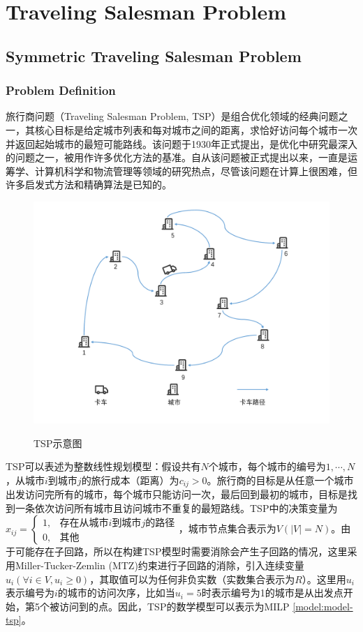 \part{Traveling Salesman Problem}
\chapter{Symmetric Traveling Salesman Problem}

\section{Problem Definition}
旅行商问题（Traveling Salesman Problem, TSP）是组合优化领域的经典问题之一，其核心目标是给定城市列表和每对城市之间的距离，求恰好访问每个城市一次并返回起始城市的最短可能路线。该问题于1930年正式提出，是优化中研究最深入的问题之一，被用作许多优化方法的基准。自从该问题被正式提出以来，一直是运筹学、计算机科学和物流管理等领域的研究热点，尽管该问题在计算上很困难，但许多启发式方法和精确算法是已知的\cite{2009A, 2012Models}。

\begin{figure}[!htb]
    \centering
    \includegraphics[width=\linewidth]{images/TSP.pdf}\\
    \caption{TSP示意图}
\end{figure}

TSP可以表述为整数线性规划模型\cite{papadimitriou1998combinatorial}：假设共有$N$个城市，每个城市的编号为$1,\cdots,N$，从城市$i$到城市$j$的旅行成本（距离）为$c_{ij}>0$。旅行商的目标是从任意一个城市出发访问完所有的城市，每个城市只能访问一次，最后回到最初的城市，目标是找到一条依次访问所有城市且访问城市不重复的最短路线。TSP中的决策变量为$x_{ij}=\begin{cases}1, & \text{存在从城市$i$到城市$j$的路径}\\0, & \text{其他} \end{cases}$，城市节点集合表示为$V(|V| = N)$。由于可能存在子回路，所以在构建TSP模型时需要消除会产生子回路的情况，这里采用Miller-Tucker-Zemlin (MTZ)约束进行子回路的消除\cite{1960Integer}，引入连续变量$u_i(\forall i \in V, u_i \geq 0)$，其取值可以为任何非负实数（实数集合表示为$R$）。这里用$u_i$表示编号为$i$的城市的访问次序，比如当$u_i = 5$时表示编号为1的城市是从出发点开始，第5个被访问到的点。因此，TSP的数学模型可以表示为MILP \ref{model:model-tsp}。

